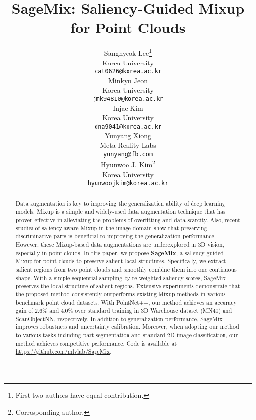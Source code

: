 \documentclass{article}
\title{SageMix: Saliency-Guided Mixup for Point Clouds}
\author{Sanghyeok Lee\thanks{First two authors have equal contribution.} \\
  Korea University \\
  \texttt{cat0626@korea.ac.kr} \\
  \And
  Minkyu Jeon\samethanks \\
  Korea University \\
  \texttt{jmk94810@korea.ac.kr} \\
  \AND
  Injae Kim \\
  Korea University \\
  \texttt{dna9041@korea.ac.kr} \\
  \And
  Yunyang Xiong \\
  Meta Reality Labs \\
  \texttt{yunyang@fb.com} \\
  \And
  Hyunwoo J. Kim\thanks{Corresponding author.} \\
  Korea University \\
  \texttt{hyunwoojkim@korea.ac.kr} \\
}
\begin{document}
\maketitle
\newcommand{\Point}{\textcolor[rgb]{0,0,0}{\mathcal{P}}}
\newcommand{\point}{\textcolor[rgb]{0,0,0}{p}}
\newcommand{\gt}{\textcolor[rgb]{0,0,0}{y}}


\newcommand{\green}{\textcolor[rgb]{0,0.5,0}}
\newcommand{\red}{\textcolor[rgb]{1,0.8,0.8}}
\newcommand{\yellow}{\textcolor[rgb]{1,1,0.8}}


\newcommand{\ie}{\textit{i.e.,} }
\newcommand{\eg}{\textit{e.g.,} }


    

\newtheorem{theorem}{Theorem}
\newtheorem{proposition}[theorem]{Proposition}
\newtheorem{corollary}[theorem]{Corollary}
\newtheorem{remark}{Remark} 
\begin{abstract}
Data augmentation is key to improving the generalization ability of deep learning models. 
Mixup is a simple and widely-used data augmentation technique that has proven effective in alleviating the problems of overfitting and data scarcity.
Also, recent studies of saliency-aware Mixup in the image domain show that preserving discriminative parts is beneficial to improving the generalization performance.
However, these Mixup-based data augmentations are underexplored in 3D vision, especially in point clouds.
In this paper, we propose \textbf{SageMix}, a saliency-guided Mixup for point clouds to preserve salient local structures.
Specifically, we extract salient regions from two point clouds and smoothly combine them into one continuous shape.
With a simple sequential sampling by re-weighted saliency scores, SageMix preserves the local structure of salient regions.
Extensive experiments demonstrate that the proposed method consistently outperforms existing Mixup methods in various benchmark point cloud datasets.
With PointNet++, our method achieves an accuracy gain of 2.6\% and 4.0\% over standard training in 
3D Warehouse dataset (MN40) and ScanObjectNN, respectively. 
In addition to generalization performance, SageMix improves robustness and uncertainty calibration. 
Moreover, when adopting our method to various tasks including part segmentation and standard 2D image classification, our method achieves competitive performance.
Code is available at \url{https://github.com/mlvlab/SageMix}. 
\end{abstract}
\end{document}
